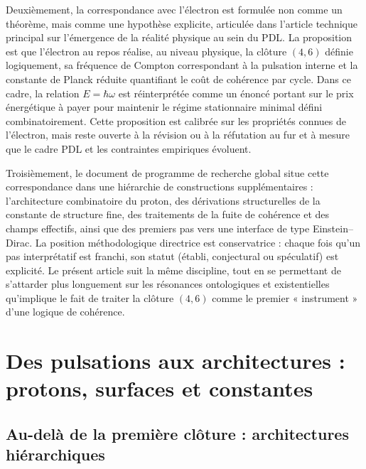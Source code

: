 \documentclass[11pt,a4paper]{article}
\theoremstyle{definition}
\begin{document}
Deuxièmement, la correspondance avec l’électron est formulée non comme un théorème, mais comme une hypothèse explicite, articulée dans l’article technique principal sur l’émergence de la réalité physique au sein du PDL.\cite{Laubscher_EmergencePhysicalReality_2024} La proposition est que l’électron au repos réalise, au niveau physique, la clôture \((4,6)\) définie logiquement, sa fréquence de Compton correspondant à la pulsation interne et la constante de Planck réduite quantifiant le coût de cohérence par cycle. Dans ce cadre, la relation \(E = \hbar \omega\) est réinterprétée comme un énoncé portant sur le prix énergétique à payer pour maintenir le régime stationnaire minimal défini combinatoirement. Cette proposition est calibrée sur les propriétés connues de l’électron, mais reste ouverte à la révision ou à la réfutation au fur et à mesure que le cadre PDL et les contraintes empiriques évoluent.\cite{Laubscher_EmergencePhysicalReality_2024,Laubscher_PDL_Position_2024,Laubscher_PDL_GlobalMapping_v6_2024}

Troisièmement, le document de programme de recherche global situe cette correspondance dans une hiérarchie de constructions supplémentaires : l’architecture combinatoire du proton, des dérivations structurelles de la constante de structure fine, des traitements de la fuite de cohérence et des champs effectifs, ainsi que des premiers pas vers une interface de type Einstein–Dirac.\cite{Laubscher_PDL_Position_2024,Laubscher_ProtonArch_v2_2024,Laubscher_Alpha_v2_2024,Laubscher_EffectiveFields_2024,Laubscher_Einstein_Dirac_2024} La position méthodologique directrice est conservatrice : chaque fois qu’un pas interprétatif est franchi, son statut (établi, conjectural ou spéculatif) est explicité. Le présent article suit la même discipline, tout en se permettant de s’attarder plus longuement sur les résonances ontologiques et existentielles qu’implique le fait de traiter la clôture \((4,6)\) comme le premier « instrument » d’une logique de cohérence.

\section{Des pulsations aux architectures : protons, surfaces et constantes}
\label{sec:architectures}

\subsection{Au-delà de la première clôture : architectures hiérarchiques}
\end{document}

